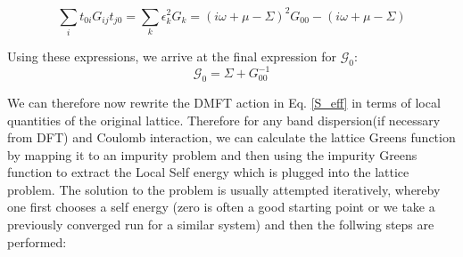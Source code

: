 \documentclass[10pt]{ruthesis}
\begin{document}
  \begin{equation}
  \sum_{i} t_{0i} G_{ij} t_{j0} = \sum_{k}\epsilon^2_k G_k= (i\omega +\mu -\Sigma)^2G_{00} -(i\omega +\mu -\Sigma)
  \end{equation} 
  
  Using these expressions, we arrive at the final expression for $\mathcal{G}_0$:
  \begin{equation}
  \mathcal{G}_0=\Sigma + G_{00}^{-1}
  \end{equation}
  
 We can therefore now rewrite the DMFT action in Eq. \ref{S_eff} in terms of local quantities of the original lattice. Therefore for any band dispersion(if necessary from DFT) and Coulomb interaction, we can calculate the lattice Greens function by mapping it to an impurity problem and then using the impurity Greens function to extract the Local Self energy which is plugged into the lattice problem. 
The solution to the problem is usually attempted iteratively, whereby one first chooses a self energy (zero is often a good starting point or we take a previously converged run for a similar system) and then the follwing steps are performed:
\end{document}
